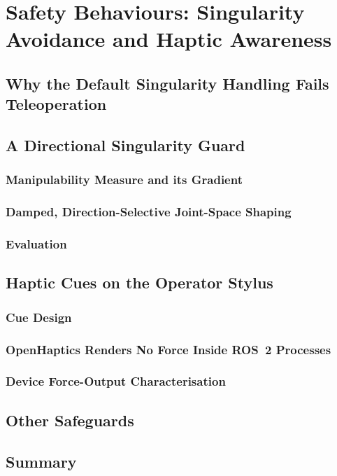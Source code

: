 \chapter{Safety Behaviours: Singularity Avoidance and Haptic Awareness}
\label{ch:safety}

\section{Why the Default Singularity Handling Fails Teleoperation}
\label{sec:safety-servo-singularity}

\section{A Directional Singularity Guard}
\label{sec:safety-guard}

\subsection{Manipulability Measure and its Gradient}
\label{sec:safety-gradient}

\subsection{Damped, Direction-Selective Joint-Space Shaping}
\label{sec:safety-shaping}

\subsection{Evaluation}
\label{sec:safety-guard-eval}

\section{Haptic Cues on the Operator Stylus}
\label{sec:safety-haptics}

\subsection{Cue Design}
\label{sec:safety-cue-design}

\subsection{OpenHaptics Renders No Force Inside ROS~2 Processes}
\label{sec:safety-openhaptics}

\subsection{Device Force-Output Characterisation}
\label{sec:safety-force-char}

\section{Other Safeguards}
\label{sec:safety-other}

\section{Summary}
\label{sec:safety-summary}
